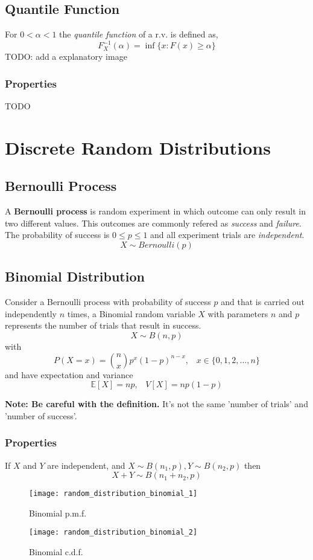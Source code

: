 \subsection{Quantile Function}
For $0 < \alpha < 1$ the \textit{quantile function} of a r.v. is defined as,
\[ F^{-1}_X (\alpha) = \inf \{ x : F(x) \geq \alpha  \} \]
TODO: add a explanatory image

\subsubsection{Properties}
TODO

\section{Discrete Random Distributions}
\subsection{Bernoulli Process}
A \textbf{Bernoulli process} is random experiment in which outcome can only result in two different values. This outcomes are
commonly refered as \textit{success} and \textit{failure}. The probability of success is $0 \leq p \leq 1$ and all experiment
trials are \textit{independent}.
\[ X \sim Bernoulli(p) \]

\subsection{Binomial Distribution}
Consider a Bernoulli process with probability of success $p$ and that is carried out independently $n$ times, a Binomial random variable 
$X$ with parameters $n$ and $p$ represents the number of trials that result in success.
\[ X \sim B(n, p) \]
with
\[ P(X=x) = \binom{n}{x}p^x(1-p)^{n-x},\;\;\; x \in \{0,1,2,\dots,n\} \]
and have expectation and variance
\[ \mathbb{E}[X] = np,\;\;\; V[X] = np(1-p) \]

\textbf{Note: Be careful with the definition.} It's not the same 'number of trials' and 'number of success'.


\subsubsection{Properties}
If $X$ and $Y$ are independent, and $X \sim B(n_1, p), Y \sim B(n_2, p)$ then 
\[ X+Y \sim B(n_1+n_2, p) \]

\begin{figure}[!ht]
    \begin{minipage}{0.45\linewidth}
      \texttt{[image: random\_distribution\_binomial\_1]}
      \caption{Binomial p.m.f.}
    \end{minipage}
    \hfill
    \begin{minipage}{0.45\linewidth}
      \texttt{[image: random\_distribution\_binomial\_2]}
      \caption{Binomial c.d.f.}
    \end{minipage}
\end{figure}

